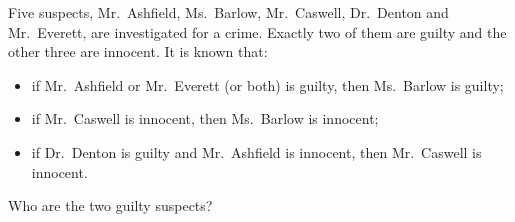 Five suspects, Mr.\ Ashfield, Ms.\ Barlow, Mr.\ Caswell, Dr.\ Denton and Mr.\ Everett, are investigated for a crime. Exactly two of them are guilty and the other three are innocent. It is known that:
\begin{itemize}
\item if Mr.\ Ashfield or Mr.\ Everett (or both) is guilty, then Ms.\ Barlow is guilty;
\item if Mr.\ Caswell is innocent, then Ms.\ Barlow is innocent;
\item if Dr.\ Denton is guilty and Mr.\ Ashfield is innocent, then Mr.\ Caswell is innocent.
\end{itemize}
Who are the two guilty suspects?
